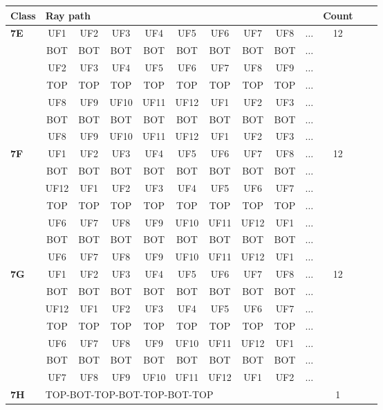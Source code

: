\begin{table}[h!]
\centering
\begin{tabular}{|l|c|c|c|c|c|c|c|c|c|c|c|c|}
\hline
Class &  \multicolumn{9}{l}{Ray path} \vline  & Count\\
\hline \hline
\textbf{7E} & UF1 & UF2 & UF3 & UF4 & UF5 & UF6 & UF7 & UF8 & $\dots$ & 12\\
 & BOT & BOT & BOT & BOT & BOT & BOT & BOT & BOT & $\dots$ & \\
 & UF2 & UF3 & UF4 & UF5 & UF6 & UF7 & UF8 & UF9 & $\dots$ & \\
 & TOP & TOP & TOP & TOP & TOP & TOP & TOP & TOP & $\dots$ & \\
 & UF8 & UF9 & UF10 & UF11 & UF12 & UF1 & UF2 & UF3 & $\dots$ & \\
 & BOT & BOT & BOT & BOT & BOT & BOT & BOT & BOT & $\dots$ & \\
 & UF8 & UF9 & UF10 & UF11 & UF12 & UF1 & UF2 & UF3 & $\dots$ & \\
\hline \hline
\textbf{7F} & UF1 & UF2 & UF3 & UF4 & UF5 & UF6 & UF7 & UF8 & $\dots$ & 12\\
 & BOT & BOT & BOT & BOT & BOT & BOT & BOT & BOT & $\dots$ & \\
 & UF12 & UF1 & UF2 & UF3 & UF4 & UF5 & UF6 & UF7 & $\dots$ & \\
 & TOP & TOP & TOP & TOP & TOP & TOP & TOP & TOP & $\dots$ & \\
 & UF6 & UF7 & UF8 & UF9 & UF10 & UF11 & UF12 & UF1 & $\dots$ & \\
 & BOT & BOT & BOT & BOT & BOT & BOT & BOT & BOT & $\dots$ & \\
 & UF6 & UF7 & UF8 & UF9 & UF10 & UF11 & UF12 & UF1 & $\dots$ & \\
\hline \hline
\textbf{7G} & UF1 & UF2 & UF3 & UF4 & UF5 & UF6 & UF7 & UF8 & $\dots$ & 12\\
 & BOT & BOT & BOT & BOT & BOT & BOT & BOT & BOT & $\dots$ & \\
 & UF12 & UF1 & UF2 & UF3 & UF4 & UF5 & UF6 & UF7 & $\dots$ & \\
 & TOP & TOP & TOP & TOP & TOP & TOP & TOP & TOP & $\dots$ & \\
 & UF6 & UF7 & UF8 & UF9 & UF10 & UF11 & UF12 & UF1 & $\dots$ & \\
 & BOT & BOT & BOT & BOT & BOT & BOT & BOT & BOT & $\dots$ & \\
 & UF7 & UF8 & UF9 & UF10 & UF11 & UF12 & UF1 & UF2 & $\dots$ & \\
\hline \hline
\textbf{7H} & \multicolumn{9}{l}{TOP-BOT-TOP-BOT-TOP-BOT-TOP} \vline  & 1\\

\end{tabular}
\end{table}
